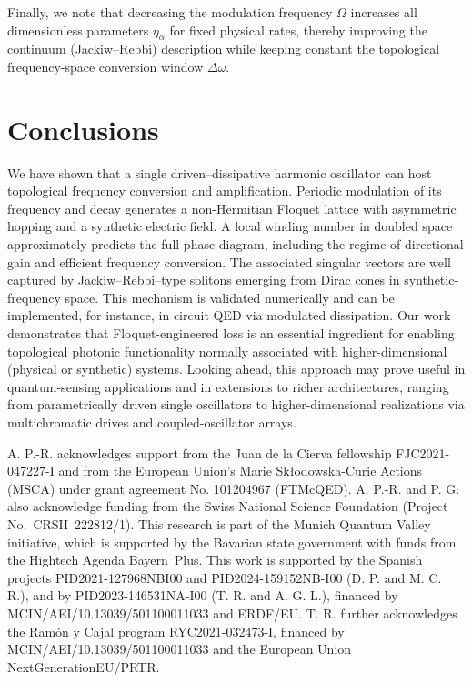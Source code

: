 \documentclass[a4paper,twocolumn,floatfix,10pt,superscriptaddress]%
{quantumarticle}
\begin{document}
Finally, we note that decreasing the modulation frequency $\Omega$ increases all dimensionless parameters $\eta_{\alpha}$ for fixed physical rates, thereby improving the continuum (Jackiw--Rebbi) description while keeping constant the topological  frequency-space conversion window $\Delta \omega$.


\section{Conclusions} We have shown that a single driven–dissipative harmonic oscillator can host topological frequency conversion and amplification. Periodic modulation of its frequency and decay generates a non-Hermitian Floquet lattice with asymmetric hopping and a synthetic electric field. A local winding number in doubled space approximately predicts the full phase diagram, including the regime of directional gain and efficient frequency conversion. The associated singular vectors are well captured by Jackiw–Rebbi–type solitons emerging from Dirac cones in synthetic-frequency space. This mechanism is validated numerically and can be implemented, for instance, in circuit QED via modulated dissipation. Our work demonstrates that Floquet-engineered loss is an essential ingredient for enabling topological photonic functionality normally associated with higher-dimensional (physical or synthetic) systems. Looking ahead, this approach may prove useful in quantum-sensing applications and in extensions to richer architectures, ranging from parametrically driven single oscillators to higher-dimensional realizations via multichromatic drives and coupled-oscillator arrays.
\begin{acknowledgments}
A. P.-R. acknowledges support from the Juan de la Cierva fellowship FJC2021-047227-I and from the European Union’s Marie Skłodowska-Curie Actions (MSCA) under grant agreement No. 101204967 (FTMcQED). A. P.-R. and P. G. also acknowledge funding from the Swiss National Science Foundation (Project No.\ CRSII~222812/1). 
This research is part of the Munich Quantum Valley initiative, which is supported by the Bavarian state government with funds from the Hightech Agenda Bayern~Plus. This work is supported by the Spanish projects PID2021-127968NBI00 and PID2024-159152NB-I00 (D. P. and M. C. R.), and by PID2023-146531NA-I00 (T. R. and A. G. L.), financed by MCIN/AEI/10.13039/501100011033 and ERDF/EU. T. R. further acknowledges the Ram\'on y Cajal program RYC2021-032473-I, financed by MCIN/AEI/10.13039/501100011033 and the European Union NextGenerationEU/PRTR.
\end{acknowledgments}
\end{document}
